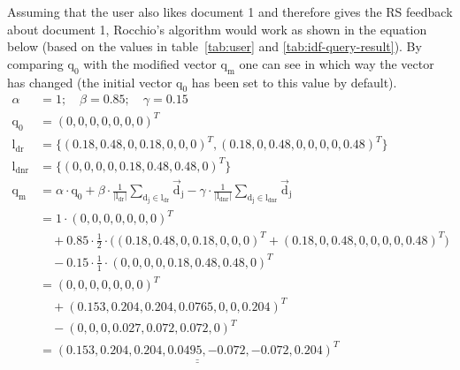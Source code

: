 \noindent
Assuming that the user also likes document 1 and therefore gives the RS feedback about document 1, Rocchio's algorithm would work as shown in the equation below (based on the values in table~\ref{tab:user} and \ref{tab:idf-query-result}).
By comparing $\text{q}_0$ with the modified vector $\text{q}_\text{m}$ one can see in which way the vector has changed (the initial vector $\text{q}_0$ has been set to this value by default).
\begin{align*}
    \alpha &= 1;\quad \beta = 0.85;\quad \gamma = 0.15\\
    \text{q}_0 &= (0, 0, 0, 0, 0, 0, 0)^T \\
    \text{l}_\text{dr} &= \{(0.18, 0.48, 0, 0.18, 0, 0, 0)^T, (0.18, 0, 0.48, 0, 0, 0, 0, 0.48)^T\}\\
    \text{l}_\text{dnr} &= \{(0, 0, 0, 0, 0.18, 0.48, 0.48, 0)^T\}\\
    \text{q}_\text{m} &=
        \alpha \cdot \text{q}_0
        + \beta \cdot \frac{1}{|\text{l}_\text{dr}|}\sum_{\text{d}_\text{j}\in\text{l}_\text{dr}}\vec{\text{d}}_\text{j}
        - \gamma \cdot \frac{1}{|\text{l}_\text{dnr}|}\sum_{\text{d}_\text{j}\in\text{l}_\text{dnr}}\vec{\text{d}}_\text{j}\\
    &= 1 \cdot (0, 0, 0, 0, 0, 0, 0)^T\\
        &\quad+ 0.85 \cdot \frac{1}{2} \cdot \big((0.18, 0.48, 0, 0.18, 0, 0, 0)^T+(0.18, 0, 0.48, 0, 0, 0, 0, 0.48)^T \big)\\
        &\quad- 0.15 \cdot \frac{1}{1} \cdot(0, 0, 0, 0, 0.18, 0.48, 0.48, 0)^T\\
    &= (0, 0, 0, 0, 0, 0, 0)^T\\
        &\quad+(0.153, 0.204, 0.204, 0.0765, 0, 0, 0.204)^T\\
        &\quad-(0, 0, 0, 0.027, 0.072, 0.072, 0)^T\\
    &= \underline{\underline{
            (0.153, 0.204, 0.204, 0.0495, -0.072, -0.072, 0.204)^T
        }}
\end{align*}




